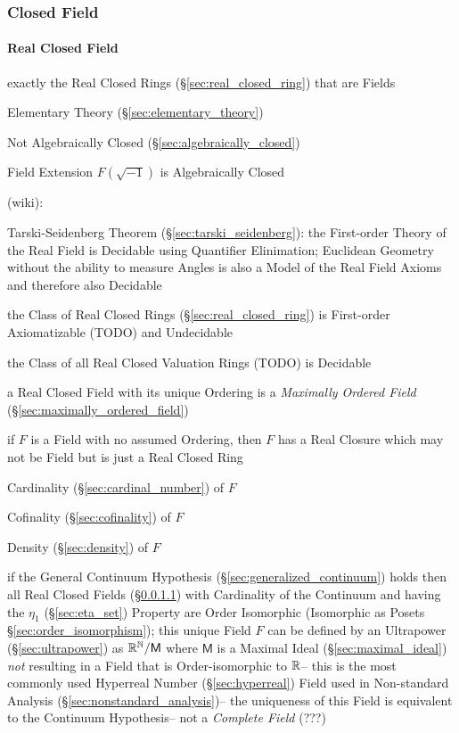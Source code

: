 \subsubsection{Closed Field}\label{sec:closed_field}

\paragraph{Real Closed Field}\label{sec:real_closed}\hfill

exactly the Real Closed Rings (\S\ref{sec:real_closed_ring}) that are Fields

Elementary Theory (\S\ref{sec:elementary_theory})

Not Algebraically Closed (\S\ref{sec:algebraically_closed})

Field Extension $F(\sqrt{-1})$ is Algebraically Closed

(wiki):

Tarski-Seidenberg Theorem (\S\ref{sec:tarski_seidenberg}): the First-order
Theory of the Real Field is Decidable using Quantifier Elinimation; Euclidean
Geometry without the ability to measure Angles is also a Model of the Real
Field Axioms and therefore also Decidable

the Class of Real Closed Rings (\S\ref{sec:real_closed_ring}) is First-order
Axiomatizable (TODO) and Undecidable

the Class of all Real Closed Valuation Rings (TODO) is Decidable

a Real Closed Field with its unique Ordering is a \emph{Maximally Ordered
  Field} (\S\ref{sec:maximally_ordered_field})

if $F$ is a Field with no assumed Ordering, then $F$ has a Real Closure which
may not be Field but is just a Real Closed Ring

Cardinality (\S\ref{sec:cardinal_number}) of $F$

Cofinality (\S\ref{sec:cofinality}) of $F$

Density (\S\ref{sec:density}) of $F$

if the General Continuum Hypothesis (\S\ref{sec:generalized_continuum}) holds
then all Real Closed Fields (\S\ref{sec:real_closed}) with Cardinality of the
Continuum and having the $\eta_1$ (\S\ref{sec:eta_set}) Property are Order
Isomorphic (Isomorphic as Posets \S\ref{sec:order_isomorphism});
this unique Field $F$ can be defined by an Ultrapower (\S\ref{sec:ultrapower})
as $\mathbb{R}^{\mathbb{N}} / \mathsf{M}$ where $\mathsf{M}$ is a Maximal Ideal
(\S\ref{sec:maximal_ideal}) \emph{not} resulting in a Field that is
Order-isomorphic to $\mathbb{R}$-- this is the most commonly used Hyperreal Number
(\S\ref{sec:hyperreal}) Field used in Non-standard Analysis
(\S\ref{sec:nonstandard_analysis})-- the uniqueness of this Field is equivalent
to the Continuum Hypothesis-- not a \emph{Complete Field} (???) %

